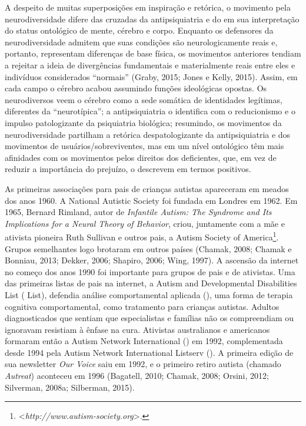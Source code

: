 A despeito de muitas superposições em inspiração e retórica, o movimento
pela neurodiversidade difere das cruzadas da antipsiquiatria e do 
em sua interpretação do status ontológico de mente, cérebro e corpo.
Enquanto os defensores da neurodiversidade admitem que suas condições
são neurologicamente reais e, portanto, representam diferenças de base
física, os movimentos anteriores tendiam a rejeitar a ideia de
divergências fundamentais e materialmente reais entre eles e indivíduos
considerados ``normais'' (Graby, 2015; Jones e Kelly, 2015). Assim, em
cada campo o cérebro acabou assumindo funções ideológicas opostas. Os
neurodiversos veem o cérebro como a sede somática de identidades
legítimas, diferentes da ``neurotípica''; a antipsiquiatria o identifica
com o reducionismo e o impulso patologizante da psiquiatria biológica;
resumindo, os movimentos da neurodiversidade partilham a retórica
despatologizante da antipsiquiatria e dos movimentos de
usuários/sobreviventes, mas em um nível ontológico têm mais afinidades
com os movimentos pelos direitos dos deficientes, que, em vez de reduzir
a importância do prejuízo, o descrevem em termos positivos.

As primeiras associações para pais de crianças autistas apareceram em
meados dos anos 1960. A National Autistic Society foi fundada em Londres
em 1962. Em 1965, Bernard Rimland, autor de \emph{Infantile Autism: The
Syndrome and Its Implications for a Neural Theory of Behavior}, criou,
juntamente com a mãe e ativista pioneira Ruth Sullivan e outros pais, a
Autism Society of America\footnote[10]{\textless{}\emph{http://www.autism-society.org}\textgreater{}.}. Grupos semelhantes logo
brotaram em outros países (Chamak, 2008; Chamak e Bonniau, 2013; Dekker,
2006; Shapiro, 2006; Wing, 1997). A ascensão da internet no começo dos
anos 1990 foi importante para grupos de pais e de ativistas. Uma das
primeiras listas de pais na internet, a Autism and Developmental
Disabilities List ( List), defendia análise comportamental
aplicada (), uma forma de terapia cognitiva comportamental, como
tratamento para crianças autistas. Adultos diagnosticados que sentiam
que especialistas e famílias não os compreendiam ou ignoravam resistiam
à ênfase na cura. Ativistas australianos e americanos formaram então a
Autism Network International () em 1992, complementada desde 1994
pela Autism Network International Listserv (). A primeira edição de
sua newsletter \emph{Our Voice} saiu em 1992, e o primeiro retiro
autista (chamado \emph{Autreat}) aconteceu em 1996 (Bagatell, 2010;
Chamak, 2008; Orsini, 2012; Silverman, 2008a; Silberman, 2015).

